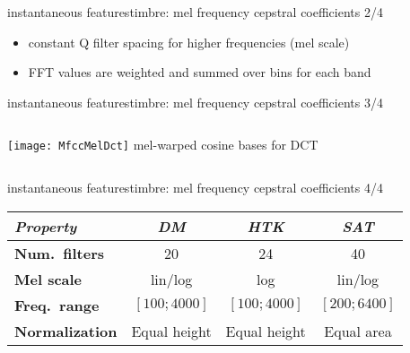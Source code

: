 		\begin{frame}{instantaneous features}{timbre: mel frequency cepstral coefficients 2/4}
            
            \begin{itemize}
                \item   constant Q filter spacing for higher frequencies (mel scale)
                \item   FFT values are weighted and summed over bins for each band
            \end{itemize}
		\end{frame}
		\begin{frame}{instantaneous features}{timbre: mel frequency cepstral coefficients 3/4}
			\vspace{-2mm}
            \begin{columns}[T]
                    \texttt{[image: MfccMelDct]}
                    mel-warped cosine bases for DCT
			\end{columns}
		\end{frame}
		\begin{frame}{instantaneous features}{timbre: mel frequency cepstral coefficients 4/4}
			\vspace{-5mm}\begin{footnotesize}
			\begin{table}
				\centering
				\begin{tabular*}{\textwidth}{@{\extracolsep{\fill}}lccc}%
                    \\ \hline
                    \bf{\emph{Property}}	 & \bf{\emph{DM}}	 & \bf{\emph{HTK}}	 & \bf{\emph{SAT}}\\ 
                     \hline
                    \bf{Num.\ filters}	 & 20	 & 24	 & 40\\
                    \bf{Mel scale}	 & lin/log	 & log	 & lin/log\\
                    \bf{Freq.\ range}	 & $[100; 4000]$	 & $[100; 4000]$	 & $[200; 6400]$\\
                    \bf{Normalization}	 & Equal height	 & Equal height	 & Equal area\\
				\end{tabular*}
			\end{table}
			\end{footnotesize}

            \vspace{-5mm}
		\end{frame}

